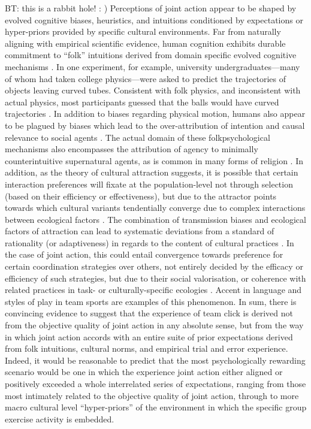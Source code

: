 BT: this is a rabbit hole! : )
Perceptions of joint action appear to be shaped by evolved cognitive biases, heuristics, and intuitions conditioned by expectations or hyper-priors provided by specific cultural environments.  Far from naturally aligning with empirical scientific evidence, human cognition exhibits durable commitment to ``folk'' intuitions derived from domain specific evolved cognitive mechanisms \citep{Bloom2007}.  In one experiment, for example, university undergraduates–--many of whom had taken college physics---were asked to predict the trajectories of objects leaving curved tubes. Consistent with folk physics, and inconsistent with actual physics, most participants guessed that the balls would have curved trajectories \citep{McCloskey1980}.
In addition to biases regarding physical motion, humans also appear to be plagued by biases which lead to the over-attribution of intention and causal relevance to social agents \citep{Atran2004}.  The actual domain of these folkpsychological mechanisms also encompasses the attribution of agency to minimally counterintuitive supernatural agents, as is common in many forms of religion \citep{Boyer2001}.
In addition, as the theory of cultural attraction suggests, it is possible that certain interaction preferences will fixate at the population-level not through selection (based on their efficiency or effectiveness), but due to the attractor points towards which cultural variants tendentially converge due to complex interactions between ecological factors \citep{Sperber1996,Mesoudi2017}. The combination of transmission biases and ecological factors of attraction can lead to systematic deviations from a standard of rationality (or adaptiveness) in regards to the content of cultural practices \citep{Kahneman2003}.  In the case of joint action, this could entail convergence towards preference for certain coordination strategies over others, not entirely decided by the efficacy or efficiency of such strategies, but due to their social valorisation, or coherence with related practices in task- or culturally-specific ecologies \citep{Claidiere2014}.  Accent in language and styles of play in team sports are examples of this phenomenon.  In sum, there is convincing evidence to suggest that the experience of team click is derived not from the objective quality of joint action in any absolute sense, but from the way in which joint action accords with an entire suite of prior expectations derived from folk intuitions, cultural norms, and empirical trial and error experience.  Indeed, it would be reasonable to predict that the most psychologically rewarding scenario would be one in which the experience joint action either aligned or positively exceeded a whole interrelated series of expectations, ranging from those most intimately related to the objective quality of joint action, through to more macro cultural level ``hyper-priors'' of the environment in which the specific group exercise activity is embedded.


